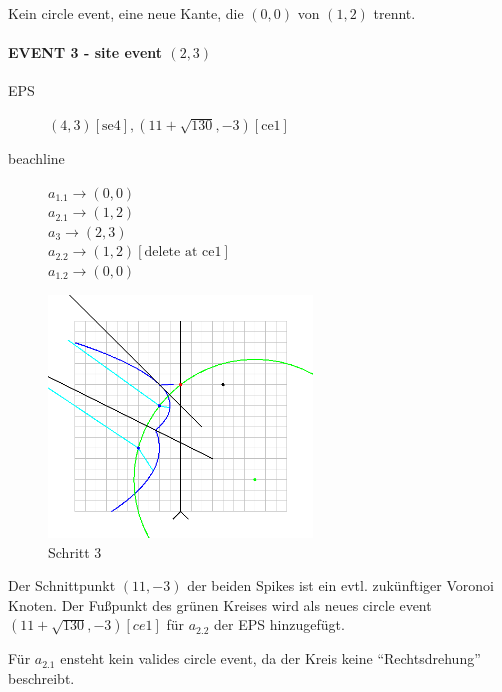 Kein circle event, eine neue Kante, die $(0,0)$ von $(1,2)$ trennt.

\newpage

\paragraph*{EVENT 3 - site event $(2,3)$}
\begin{description}
\item[EPS] $(4,3)[\text{se4}], (11 + \sqrt{130}, -3)[\text{ce1}]$
\item[beachline]
$a_{1.1} \rightarrow (0,0)$\\
$a_{2.1} \rightarrow (1,2)$\\
$a_3 \rightarrow (2,3)$\\
$a_{2.2} \rightarrow (1,2)[\text{delete at ce1}]$\\
$a_{1.2} \rightarrow (0,0)$
\end{description}

\begin{figure}[h]
\begin{center}
\includegraphics[width=7cm]{capture3}
\end{center}
\caption{Schritt 3}
\label{fig:c3}
\end{figure}

Der Schnittpunkt $(11, -3)$ der beiden Spikes ist ein evtl. zukünftiger Voronoi Knoten. Der Fußpunkt des grünen Kreises wird als neues circle event $(11 + \sqrt{130}, -3)[ce1]$ für $a_{2.2}$ der EPS hinzugefügt.

Für $a_{2.1}$ ensteht kein valides circle event, da der Kreis keine "`Rechtsdrehung"' beschreibt.

\newpage

